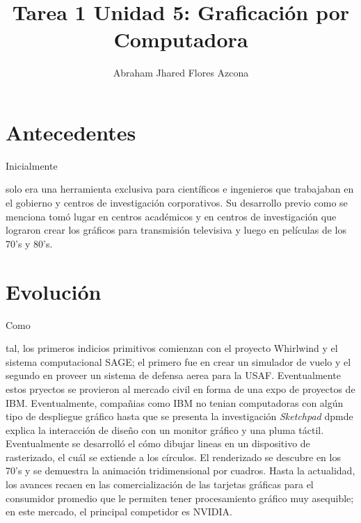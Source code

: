 \documentclass[stu, 12pt, letterpaper, donotrepeattitle, floatsintext, natbib]{apa7}
\title{\Large Tarea 1 Unidad 5: Graficación por Computadora}
\author{Abraham Jhared Flores Azcona} %
\affiliation{Instituto Tecnológico de Tijuana}
\begin{document}
    \maketitle

    \newpage
    \section{Antecedentes}
    Inicialmente \begin{justify}
      solo era una herramienta exclusiva para científicos e ingenieros que trabajaban
      en el gobierno y centros de investigación corporativos. Su desarrollo previo como se menciona
      tomó lugar en centros académicos y en centros de investigación que lograron crear los gráficos
      para transmisión televisiva y luego en películas de los 70's y 80's.\citep{unknown-author-2020}\par 
    \end{justify}
    \vspace{\baselineskip}
    \section{Evolución}
    Como \begin{justifying}
      tal, los primeros indicios primitivos comienzan con el proyecto Whirlwind y el sistema computacional SAGE;
      el primero fue en crear un simulador de vuelo y el segundo en proveer un sistema de defensa aerea para la USAF.
      Eventualmente estos pryectos se provieron al mercado civil en forma de una expo de proyectos de IBM. Eventualmente,
      compañias como IBM no tenian computadoras con algún tipo de despliegue gráfico hasta que se presenta la investigación
      \emph{Sketchpad} dpmde explica la interacción de diseño con un monitor gráfico y una pluma táctil. 
      Eventualmente se desarrolló el cómo dibujar lineas en un dispositivo de rasterizado, el cuál se extiende a los círculos.
      El renderizado se descubre en los 70's y se demuestra la animación tridimensional por cuadros.
      Hasta la actualidad, los avances recaen en las comercialización de las tarjetas gráficas para el consumidor promedio que le permiten
      tener procesamiento gráfico muy asequible; en este mercado, el principal competidor es NVIDIA. \citep{unknown-author-no-date}\par   
    \end{justifying}
    \vspace{\baselineskip}
\end{document}
